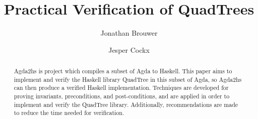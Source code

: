 \documentclass[english]{article}
\title{Practical Verification of QuadTrees}
\author[1]{Jonathan Brouwer}
\author[1]{Jesper Cockx}
\affil[1]{TU Delft}
\date{}
\begin{document}
\maketitle

\begin{abstract}
Agda2hs is project which compiles a subset of Agda to Haskell. This paper aims to implement and verify the Haskell library QuadTree in this subset of Agda, so Agda2hs can then produce a verified Haskell implementation. Techniques are developed for proving invariants, preconditions, and post-conditions, and are applied in order to implement and verify the QuadTree library. Additionally, recommendations are made to reduce the time needed for verification.
\end{abstract}









\newpage


\end{document}
